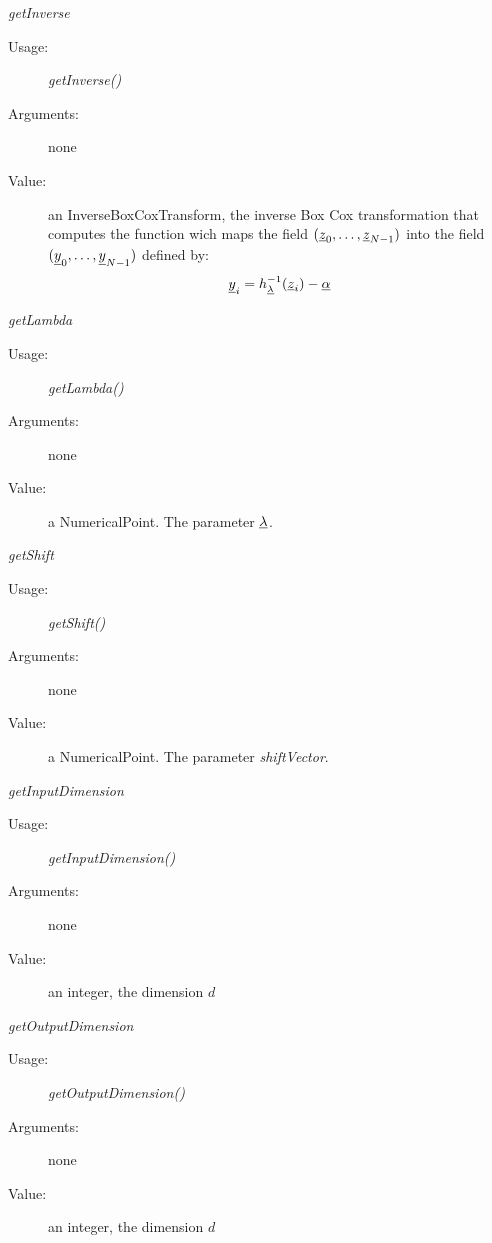 \begin{description}
\begin{description}
\begin{description}
\end{description}
\bigskip

\item \textit{getInverse}
\begin{description}
\item[Usage:] \textit{getInverse()}
\item[Arguments:] none
\item[Value:]   an InverseBoxCoxTransform, the inverse Box Cox transformation that computes the function wich maps the field  $({\underline{z}}_{0}, \dots,{\underline{z}}_{N-1})$ into the field $({\underline{y}}_{0}, \dots,{\underline{y}}_{N-1})$ defined by:
\begin{align}
{\underline{y}}_{i} = h^{-1}_{{\underline{\lambda}}}({\underline{z}}_{i})-{\underline{\alpha}}
\end{align}
\end{description}
\bigskip

\item \textit{getLambda}
\begin{description}
\item[Usage:] \textit{getLambda()}
\item[Arguments:] none
\item[Value:]   a NumericalPoint. The parameter ${\underline{\lambda}}$.
\end{description}
\bigskip

\item \textit{getShift}
\begin{description}
\item[Usage:] \textit{getShift()}
\item[Arguments:] none
\item[Value:]   a NumericalPoint. The parameter \textit{shiftVector}.
\end{description}
\bigskip

\item \textit{getInputDimension}
\begin{description}
\item[Usage:] \textit{getInputDimension()}
\item[Arguments:] none
\item[Value:]   an integer, the dimension $d$
\end{description}
\bigskip

\item \textit{getOutputDimension}
\begin{description}
\item[Usage:] \textit{getOutputDimension()}
\item[Arguments:] none
\item[Value:]   an integer, the dimension $d$
\end{description}


\end{description}

\end{description}

